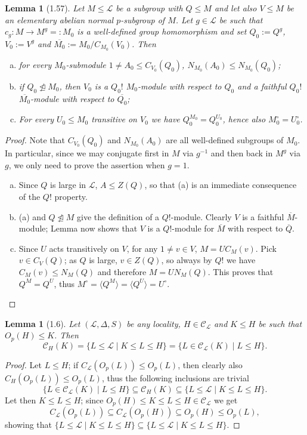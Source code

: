 \documentclass{amsart}
\numberwithin{equation}{section}
\newtheorem{lemma}[equation]{Lemma}
\theoremstyle{definition}
\theoremstyle{subresult}
\theoremstyle{caseresult}
\renewcommand{\L}{\mathcal{L}}
\newcommand{\C}{\mathcal{C}}
\newcommand{\ov}{\overline}
\newcommand{\norm}{\trianglelefteq}
\newcommand{\inv}{^{-1}}
\newcommand{\<}{\langle}
\renewcommand{\>}{\rangle}
\begin{document}
\begin{lemma}[1.57]\label{lemma1.57}
Let $M \le \L$ be a subgroup with $Q \le M$ and let also $V \le M$ be an elementary abelian normal $p$-subgroup of $M$. Let $g \in \L$ be such that $c_g \colon M \to M^g =: M_0$ is a well-defined group homomorphism and set $Q_0:= Q^g$, $V_0:=V^g$ and $\ov{M_0} := M_0/C_{M_0}(V_0)$. Then
\begin{enumerate}[(a)]
	\item for every $M_0$-submodule $1 \ne A_0 \le C_{V_0}(Q_0)$, $N_{M_0}(A_0) \le N_{M_0}(Q_0)$;
	\item if $Q_0 \not \norm M_0$, then $V_0$ is a $Q_0!$ $M_0$-module with respect to $Q_0$ and a faithful $Q_0!$ $\ov{M_0}$-module with respect to $\ov{Q_0}$;
	\item For every $U_0 \le M_0$ transitive on $V_0$ we have $Q_0^{M_0} = Q_0^{U_0}$, hence also $M_0^\circ = U_0^\circ$.
\end{enumerate}
\end{lemma}
\begin{proof}
Note that $C_{V_0}(Q_0)$ and $N_{M_0}(A_0)$ are all well-defined subgroups of $M_0$. In particular, since we may conjugate first in $M$ via $g\inv$ and then back in $M^g$ via $g$, we only need to prove the assertion when $g=1$. 
\begin{enumerate}[(a)]
	\item Since $Q$ is large in $\L$, $A \le Z(Q)$, so that (a) is an immediate consequence of the $Q!$ property.
	\item (a) and $Q \not \norm M$ give the definition of a $Q!$-module. Clearly $V$ is a faithful $\ov{M}$-module; Lemma \cite[A.51]{Meier-Stell-Stroth:2012} now shows that $V$ is a $Q!$-module for $\ov{M}$ with respect to $\ov{Q}$.
	\item Since $U$ acts transitively on $V$, for any $1 \ne v \in V$, $M=U C_M(v)$. Pick $v \in C_V(Q)$; as $Q$ is large, $v \in Z(Q)$, so always by $Q!$ we have $C_M(v) \le N_M(Q)$ and therefore $M = U N_M(Q)$. This proves that $Q^M = Q^U$, thus $M^\circ = \< Q^M \> = \< Q^U\> = U^\circ$. 
\end{enumerate}
\end{proof}


\begin{lemma}[1.6]\label{lemma1.6}
	Let $(\L,\Delta,S)$ be any locality, $H \in \C_\L$ and $K\le H$ be such that $O_p(H) \le K$. Then
	\[
	\C_H(K) = \{L \le \L \mid K \le L \le H \} = \{ L \in \C_\L(K) \mid L \le H \}.
	\]
\end{lemma}
\begin{proof}
	Let $L \le H$; if $C_\L(O_p(L)) \le O_p(L)$, then clearly also $C_H(O_p(L)) \le O_p(L)$, thus the following inclusions are trivial
	\[
	\{ L \in \C_\L(K) \mid L \le H \} \subseteq \C_H(K) \subseteq \{L \le \L \mid K \le L \le H \}.
	\]
	Let then $K \le L \le H$; since $O_p(H) \le K \le L \le H \in \C_\L$ we get
	\[
	C_\L(O_p(L)) \subseteq C_\L(O_p(H)) \subseteq O_p(H) \le O_p(L),
	\]
	showing that $\{L \le \L \mid K \le L \le H \} \subseteq \{L \le \L \mid K \le L \le H \}$.
\end{proof}
\end{document}
